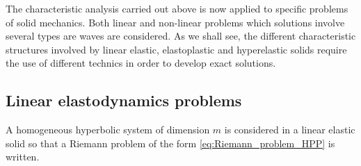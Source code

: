 The characteristic analysis carried out above is now applied to specific problems of solid mechanics. Both linear and non-linear problems which solutions involve several types are waves are considered.
As we shall see, the different characteristic structures involved by linear elastic, elastoplastic and hyperelastic solids require the use of different technics in order to develop exact solutions.

\subsection{Linear elastodynamics problems}
\label{subsec:charac_Linear_problems}
A homogeneous hyperbolic system of dimension $m$ is considered in a linear elastic solid so that a Riemann problem of the form \eqref{eq:Riemann_problem_HPP} is written.%

